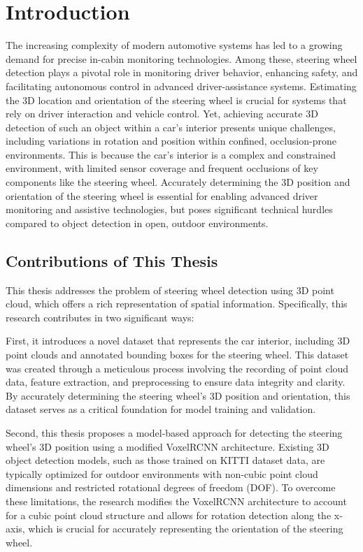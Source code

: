 \chapter{Introduction}


The increasing complexity of modern automotive systems has led to a growing
demand for precise in-cabin monitoring technologies. Among these, 
steering wheel detection plays a pivotal role in monitoring driver
behavior, enhancing safety, and facilitating autonomous control in 
advanced driver-assistance systems. Estimating the 3D location and 
orientation of the steering wheel is crucial for systems that rely on
driver interaction and vehicle control. 
Yet, achieving accurate 3D detection of such an object within a car's 
interior presents unique challenges, including variations in rotation and
position within confined, occlusion-prone environments. This is because 
the car's interior is a complex and constrained environment, with limited 
sensor coverage and frequent occlusions of key components like the 
steering wheel. Accurately determining the 3D position and orientation of 
the steering wheel is essential for enabling advanced driver monitoring 
and assistive technologies, but poses significant technical hurdles 
compared to object detection in open, outdoor environments. 


\section{Contributions of This Thesis}
This thesis addresses the problem of steering wheel detection using 3D 
point cloud, which offers a rich representation of spatial information. 
Specifically, this research contributes in two significant ways: 

First, it introduces a novel dataset that represents the car interior, 
including 3D point clouds and annotated bounding boxes for the steering 
wheel. This dataset was created through a meticulous process involving 
the recording of point cloud data, feature extraction, and preprocessing 
to ensure data integrity and clarity. By accurately determining the 
steering wheel’s 3D position and orientation, this dataset serves as a 
critical foundation for model training and validation.

Second, this thesis proposes a model-based approach for detecting the 
steering wheel’s 3D position using a modified VoxelRCNN architecture. 
Existing 3D object detection models, such as those trained on KITTI 
dataset data, are typically optimized for outdoor environments with 
non-cubic point cloud dimensions and restricted rotational degrees of 
freedom (DOF). To overcome these limitations, the research modifies the VoxelRCNN 
architecture to account for a cubic point cloud structure and allows for rotation detection along 
the x-axis, which is crucial for accurately representing the orientation of the steering wheel.

